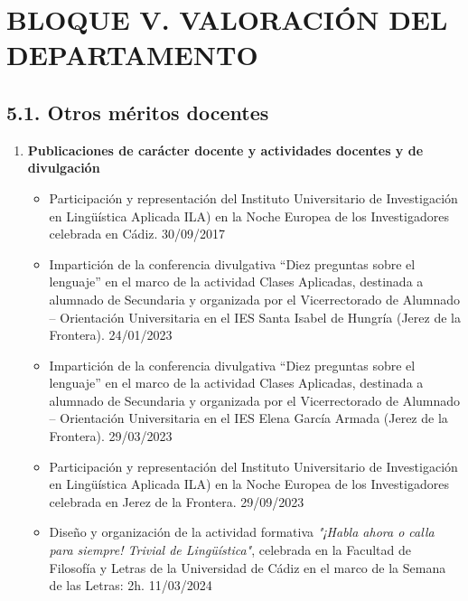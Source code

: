 \section*{BLOQUE V. VALORACIÓN DEL DEPARTAMENTO}

\subsection*{5.1. Otros méritos docentes}

\begin{enumerate}[label=\alph*)]

  \item \textbf{Publicaciones de carácter docente y actividades docentes y de divulgación}
  
        \begin{itemize}
        
            \item Participación y representación del Instituto Universitario de Investigación en Lingüística Aplicada ILA) en la Noche Europea de los Investigadores celebrada en Cádiz. \hfill 30/09/2017
            
            \item Impartición de la conferencia divulgativa “Diez preguntas sobre el lenguaje” en el marco de la actividad Clases Aplicadas, destinada a alumnado de Secundaria y organizada por el Vicerrectorado de Alumnado – Orientación Universitaria en el IES Santa Isabel de Hungría (Jerez de la Frontera). \hfill 24/01/2023
            
            \item Impartición de la conferencia divulgativa “Diez preguntas sobre el lenguaje” en el marco de la actividad Clases Aplicadas, destinada a alumnado de Secundaria y organizada por el Vicerrectorado de Alumnado – Orientación Universitaria en el IES Elena García Armada (Jerez de la Frontera). \hfill 29/03/2023
            
            \item Participación y representación del Instituto Universitario de Investigación en Lingüística Aplicada ILA) en la Noche Europea de los Investigadores celebrada en Jerez de la Frontera. \hfill 29/09/2023

            \item Diseño y organización de la actividad formativa \textit{"¡Habla ahora o calla para siempre! Trivial de Lingüística"}, celebrada en la Facultad de Filosofía y Letras de la Universidad de Cádiz en el marco de la Semana de las Letras: 2h. \hfill 11/03/2024
            

\end{itemize}
\end{enumerate}
